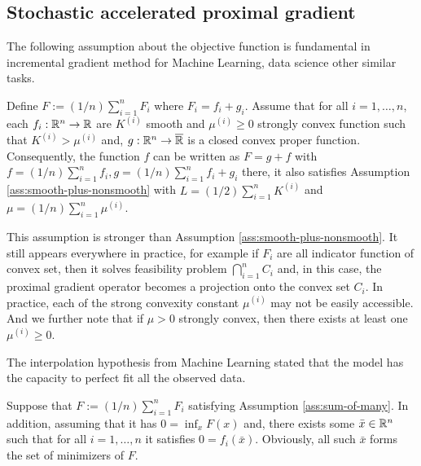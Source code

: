 \documentclass[12pt]{article}
\begin{document}
    \subsection{Stochastic accelerated proximal gradient}
        The following assumption about the objective function is fundamental in incremental gradient method for Machine Learning, data science other similar tasks. 
        \begin{assumption}\label{ass:sum-of-many}
            Define $F := (1/n)\sum_{i = 1}^{n} F_i$ where $F_i = f_i + g_i$.
            Assume that for all $i = 1, \ldots, n$, each $f_i:\mathbb R^n \rightarrow \mathbb R$ are $K^{(i)}$ smooth and $\mu^{(i)} \ge 0$ strongly convex function such that $K^{(i)} > \mu^{(i)}$ and, $g:\mathbb R^n \rightarrow \overline {\mathbb R}$ is a closed convex proper function. 
            Consequently, the function $f$ can be written as $F = g + f$ with $f = (1/n)\sum_{i = 1}^{n} f_i, g = (1/n)\sum_{i = 1}^{n}f_i + g_i$ there, it also satisfies Assumption \ref{ass:smooth-plus-nonsmooth} with $L = (1/2)\sum_{i = 1}^n K^{(i)}$ and $\mu = (1/n)\sum_{i = 1}^{n}\mu^{(i)}$. 
        \end{assumption}
        This assumption is stronger than Assumption \ref{ass:smooth-plus-nonsmooth}. 
        It still appears everywhere in practice, for example if $F_i$ are all indicator function of convex set, then it solves feasibility problem $\bigcap_{i = 1}^n C_i$ and, in this case, the proximal gradient operator becomes a projection onto the convex set $C_i$. 
        In practice, each of the strong convexity constant $\mu^{(i)}$ may not be easily accessible. 
        And we further note that if $\mu > 0$ strongly convex, then there exists at least one $\mu^{(i)} \ge 0$. 
        \par
        The interpolation hypothesis from Machine Learning stated that the model has the capacity to perfect fit all the observed data. 
        \begin{assumption}\label{ass:interp-hypothesis}
            Suppose that $F := (1/n)\sum_{i = 1}^{n} F_i$ satisfying Assumption \ref{ass:sum-of-many}. 
            In addition, assuming that it has $0 = \inf_{x}F(x)$ and, there exists some $\bar x \in \mathbb R^n$ such that for all $i = 1, \ldots, n$ it satisfies $0 = f_i(\bar x)$. 
            Obviously, all such $\bar x$ forms the set of minimizers of $F$. 
        \end{assumption}
\end{document}
